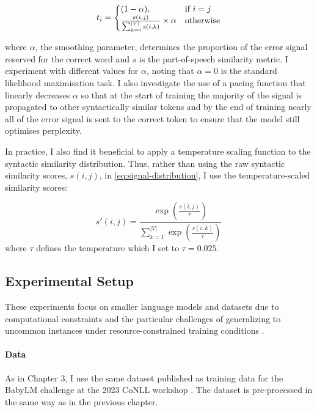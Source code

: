 \begin{equation}
\label{eq:signal-distribution}
    t_i=\left\{
  \begin{array}{@{}ll@{}}
    (1-\alpha), & \text{if}\ i=j \\
    \frac{s(i,j)}{\sum_{k=0}^{|V|}{s(i,k)}} \times \alpha & \text{otherwise}
  \end{array}\right.
\end{equation}

\noindent

where $\alpha$, the smoothing parameter, determines the proportion of the error signal reserved for the correct word and $s$ is the part-of-speech similarity metric. I experiment with different values for $\alpha$, noting that $\alpha=0$ is the standard likelihood maximisation task. I also investigate the use of a pacing function that linearly decreases $\alpha$ so that at the start of training the majority of the signal is propagated to other syntactically similar tokens and by the end of training nearly all of the error signal is sent to the correct token to ensure that the model still optimises perplexity. 

In practice, I also find it beneficial to apply a temperature scaling function to the syntactic similarity distribution. Thus, rather than using the raw syntactic similarity scores, $s(i,j)$, in \cref{eq:signal-distribution}, I use the temperature-scaled similarity scores:

$$
s'(i,j) = \frac{\exp\left(\frac{s(i,j)}{\tau}\right)}{\sum_{k=1}^{|V|} \exp\left(\frac{s(i,k)}{\tau}\right)}
$$
where $\tau$ defines the temperature which I set to $\tau=0.025$.

\subsection{Experimental Setup}
\label{subsection:experimental_setup}

These experiments focus on smaller language models and datasets due to computational constraints and the particular challenges of generalizing to uncommon instances under resource-constrained training conditions \citep{warstadt2023babylm1,diehlmartinez2023climb}. 

\paragraph{Data} \label{paragraph:data} As in Chapter 3, I use the same dataset published as training data for the BabyLM challenge at the 2023 CoNLL workshop \citep{warstadt2023babylm1}. The dataset is pre-processed in the same way as in the previous chapter. 

